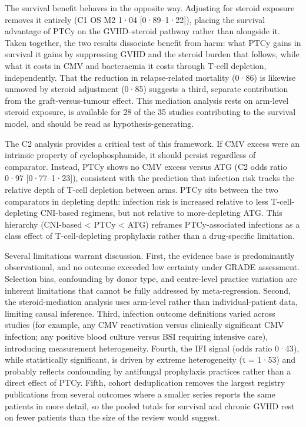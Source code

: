 \documentclass[
  british,
  8.6pt,
  a4paper,
  twocolumn]{article}
\begin{document}
The survival benefit behaves in the opposite way. Adjusting for steroid
exposure removes it entirely (C1 OS M2 1·04 {[}0·89--1·22{]}), placing
the survival advantage of PTCy on the GVHD--steroid pathway rather than
alongside it. Taken together, the two results dissociate benefit from
harm: what PTCy gains in survival it gains by suppressing GVHD and the
steroid burden that follows, while what it costs in CMV and bacteraemia
it costs through T-cell depletion, independently. That the reduction in
relapse-related mortality (0·86) is likewise unmoved by steroid
adjustment (0·85) suggests a third, separate contribution from the
graft-versus-tumour effect. This mediation analysis rests on arm-level
steroid exposure, is available for 28 of the 35 studies contributing to
the survival model, and should be read as hypothesis-generating.

The C2 analysis provides a critical test of this framework. If CMV
excess were an intrinsic property of cyclophosphamide, it should persist
regardless of comparator. Instead, PTCy shows no CMV excess versus ATG
(C2 odds ratio 0·97 {[}0·77--1·23{]}), consistent with the prediction
that infection risk tracks the relative depth of T-cell depletion
between arms. PTCy sits between the two comparators in depleting depth:
infection risk is increased relative to less T-cell-depleting CNI-based
regimens, but not relative to more-depleting ATG. This hierarchy
(CNI-based \textless{} PTCy \textless{} ATG) reframes PTCy-associated
infections as a class effect of T-cell-depleting prophylaxis rather than
a drug-specific limitation.

Several limitations warrant discussion. First, the evidence base is
predominantly observational, and no outcome exceeded low certainty under
GRADE assessment. Selection bias, confounding by donor type, and
centre-level practice variation are inherent limitations that cannot be
fully addressed by meta-regression. Second, the steroid-mediation
analysis uses arm-level rather than individual-patient data, limiting
causal inference. Third, infection outcome definitions varied across
studies (for example, any CMV reactivation versus clinically significant
CMV infection; any positive blood culture versus BSI requiring intensive
care), introducing measurement heterogeneity. Fourth, the IFI signal
(odds ratio 0·43), while statistically significant, is driven by extreme
heterogeneity (τ = 1·53) and probably reflects confounding by antifungal
prophylaxis practices rather than a direct effect of PTCy. Fifth, cohort
deduplication removes the largest registry publications from several
outcomes where a smaller series reports the same patients in more
detail, so the pooled totals for survival and chronic GVHD rest on fewer
patients than the size of the review would suggest.
\end{document}
